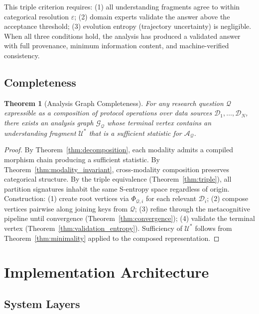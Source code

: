 \documentclass[10pt,twocolumn]{article}
\newtheorem{theorem}{Theorem}[section]
\theoremstyle{definition}
\theoremstyle{remark}
\newcommand{\morphism}{\Phi}
\newcommand{\question}{\mathcal{Q}}
\newcommand{\answer}{\mathcal{A}}
\newcommand{\dataset}{\mathcal{D}}
\newcommand{\understanding}{\mathcal{U}}
\newcommand{\graph}{\mathcal{G}}
\begin{document}
This triple criterion requires: (1) all understanding fragments agree to within categorical resolution $\varepsilon$; (2) domain experts validate the answer above the acceptance threshold; (3) evolution entropy (trajectory uncertainty) is negligible. When all three conditions hold, the analysis has produced a validated answer with full provenance, minimum information content, and machine-verified consistency.

\subsection{Completeness}

\begin{theorem}[Analysis Graph Completeness]
\label{thm:graph_completeness}
For any research question $\question$ expressible as a composition of protocol operations over data sources $\dataset_1, \ldots, \dataset_N$, there exists an analysis graph $\graph_\question$ whose terminal vertex contains an understanding fragment $\understanding^*$ that is a sufficient statistic for $\answer_\question$.
\end{theorem}

\begin{proof}
By Theorem~\ref{thm:decomposition}, each modality admits a compiled morphism chain producing a sufficient statistic. By Theorem~\ref{thm:modality_invariant}, cross-modality composition preserves categorical structure. By the triple equivalence (Theorem~\ref{thm:triple}), all partition signatures inhabit the same S-entropy space regardless of origin. Construction: (1) create root vertices via $\morphism_{\question,i}$ for each relevant $\dataset_i$; (2) compose vertices pairwise along joining keys from $\question$; (3) refine through the metacognitive pipeline until convergence (Theorem~\ref{thm:convergence}); (4) validate the terminal vertex (Theorem~\ref{thm:validation_entropy}). Sufficiency of $\understanding^*$ follows from Theorem~\ref{thm:minimality} applied to the composed representation.
\end{proof}

\section{Implementation Architecture}
\label{sec:implementation}

\subsection{System Layers}
\end{document}
